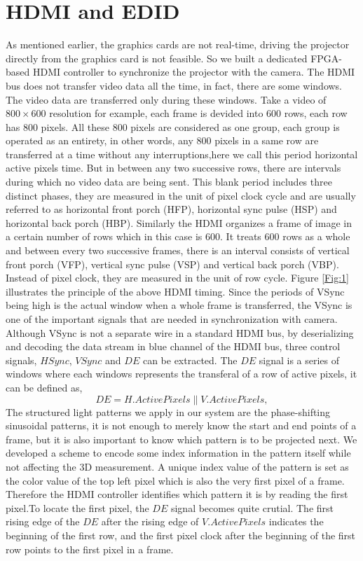 \documentclass[]{spie}  %
\begin{document}
\section{HDMI and EDID}
As mentioned earlier, the graphics cards are not real-time, driving the projector directly from the graphics card is not feasible. So we built a dedicated FPGA-based HDMI controller to synchronize the projector with the camera. The HDMI bus does not transfer video data all the time, in fact, there are some windows. The video data are transferred only during these windows. Take a video of $800 \times 600$ resolution for example, each frame is devided into 600 rows,  each row has 800 pixels. All these 800 pixels are considered as one group, each group is operated as an entirety, in other words, any 800 pixels in a same row are transferred at a time without any interruptions,here we call this period horizontal active pixels time. But in between any two successive rows, there are intervals during which no video data are being sent. This blank period includes three distinct phases, they are measured in the unit of pixel clock cycle and are usually referred to as horizontal front porch (HFP), horizontal sync pulse (HSP) and horizontal back porch (HBP). Similarly the HDMI organizes a frame of image in a certain number of rows which in this case is 600. It treats 600 rows as a whole and between every two successive frames, there is an interval consists of vertical front porch (VFP), vertical sync pulse (VSP) and vertical back porch (VBP). Instead of pixel clock, they are measured in the unit of row cycle.  Figure \ref{Fig:1} illustrates the principle of the above HDMI timing.
Since the periods of VSync being high is the actual window when a whole frame is transferred, the VSync is one of the important signals that are needed in synchronization with camera. Although VSync is not a separate wire in a standard HDMI bus, by deserializing and decoding the data stream in blue channel of the HDMI bus, three control signals,  $HSync$, $VSync$ and $DE$ can be extracted. The $DE$ signal is a series of windows where each windows represents the transferal of a row of active pixels, it can be defined as, 
 \begin{equation} \label{}
  	DE = H.Active Pixels \parallel V. Active Pixels,
  \end{equation}
The structured light patterns we apply in our system are the phase-shifting sinusoidal patterns, it is not enough to merely know the start and end points of a frame, but it is also important to know which pattern is to be projected next. We developed a scheme to encode some index information in the pattern itself while not  affecting the 3D measurement. A unique index value of the pattern is set as the color value of the top left pixel which is also the very first pixel of a frame. Therefore the HDMI controller identifies which pattern it is by reading the first pixel.To locate the first pixel, the $DE$ signal becomes quite crutial. The first rising edge of the $DE$ after the rising edge of $V.Active Pixels$ indicates the beginning of the first row, and the first pixel clock after the beginning of the first row points to the first pixel in a frame.
\end{document}
